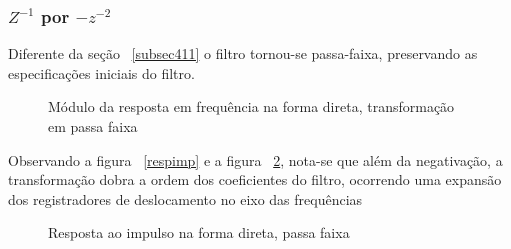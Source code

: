 \documentclass[12pt]{article}
\begin{document}
\subsubsection{$Z^{-1}$ por $-z^{-2}$}

Diferente da se\c c\~ao ~\ref{subsec411} o filtro tornou-se passa-faixa, preservando as especifica\c c\~oes iniciais do filtro.

\begin{figure}[H]
\caption{Módulo da resposta em frequ\^encia na forma direta, transforma\c c\~ao em passa faixa}
\label{passa_faixa}
\end{figure}

Observando a figura ~\ref{respimp} e a figura ~\ref{passa_faixa2}, nota-se que al\'em da negativa\c c\~ao, a transforma\c c\~ao dobra a ordem dos coeficientes do filtro, ocorrendo uma expans\~ao dos registradores de deslocamento no eixo das frequ\^encias 

\begin{figure}[H]
\caption{Resposta ao impulso na forma direta, passa faixa}
\label{passa_faixa2}
\end{figure}



\end{document}
